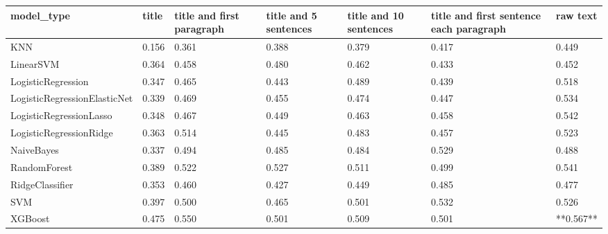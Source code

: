 \begin{tabular}{lllllll}
\toprule
                  model\_type & title & title and first paragraph & title and 5 sentences & title and 10 sentences & title and first sentence each paragraph &  raw text \\
\midrule
                         KNN & 0.156 &                     0.361 &                 0.388 &                  0.379 &                                   0.417 &     0.449 \\
                   LinearSVM & 0.364 &                     0.458 &                 0.480 &                  0.462 &                                   0.433 &     0.452 \\
          LogisticRegression & 0.347 &                     0.465 &                 0.443 &                  0.489 &                                   0.439 &     0.518 \\
LogisticRegressionElasticNet & 0.339 &                     0.469 &                 0.455 &                  0.474 &                                   0.447 &     0.534 \\
     LogisticRegressionLasso & 0.348 &                     0.467 &                 0.449 &                  0.463 &                                   0.458 &     0.542 \\
     LogisticRegressionRidge & 0.363 &                     0.514 &                 0.445 &                  0.483 &                                   0.457 &     0.523 \\
                  NaiveBayes & 0.337 &                     0.494 &                 0.485 &                  0.484 &                                   0.529 &     0.488 \\
                RandomForest & 0.389 &                     0.522 &                 0.527 &                  0.511 &                                   0.499 &     0.541 \\
             RidgeClassifier & 0.353 &                     0.460 &                 0.427 &                  0.449 &                                   0.485 &     0.477 \\
                         SVM & 0.397 &                     0.500 &                 0.465 &                  0.501 &                                   0.532 &     0.526 \\
                     XGBoost & 0.475 &                     0.550 &                 0.501 &                  0.509 &                                   0.501 & **0.567** \\
\bottomrule
\end{tabular}
